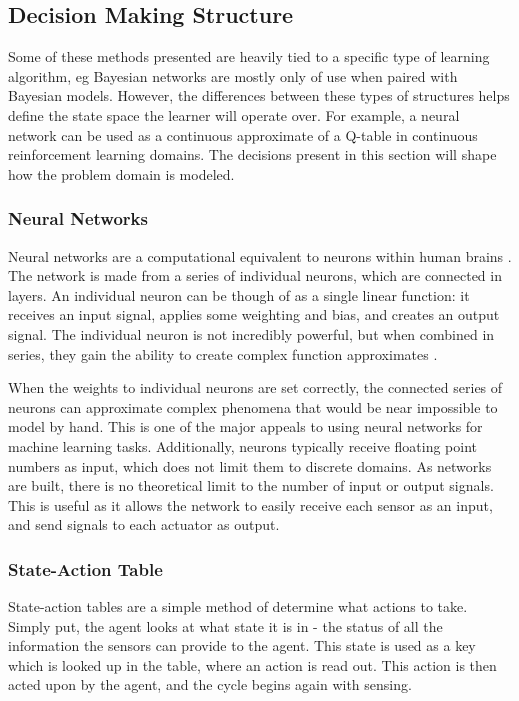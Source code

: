 \documentclass[draftclsnofoot,onecolumn,letterpaper,10pt]{IEEEtran}
\begin{document}
\subsection{Decision Making Structure}
Some of these methods presented are heavily tied to a specific type of learning algorithm, eg Bayesian networks are mostly only of use when paired with Bayesian models.
However, the differences between these types of structures helps define the state space the learner will operate over.
For example, a neural network can be used as a continuous approximate of a Q-table in continuous reinforcement learning domains.
The decisions present in this section will shape how the problem domain is modeled.

\subsubsection{Neural Networks}
Neural networks are a computational equivalent to neurons within human brains \cite{SuttonBarto}.
The network is made from a series of individual neurons, which are connected in layers.
An individual neuron can be though of as a single linear function: it receives an input signal, applies some weighting and bias, and creates an output signal.
The individual neuron is not incredibly powerful, but when combined in series, they gain the ability to create complex function approximates \cite{SuttonBarto}.

When the weights to individual neurons are set correctly, the connected series of neurons can approximate complex phenomena that would be near impossible to model by hand.
This is one of the major appeals to using neural networks for machine learning tasks.
Additionally, neurons typically receive floating point numbers as input, which does not limit them to discrete domains.
As networks are built, there is no theoretical limit to the number of input or output signals.
This is useful as it allows the network to easily receive each sensor as an input, and send signals to each actuator as output.

\subsubsection{State-Action Table}
State-action tables are a simple method of determine what actions to take.
Simply put, the agent looks at what state it is in - the status of all the information the sensors can provide to the agent.
This state is used as a key which is looked up in the table, where an action is read out.
This action is then acted upon by the agent, and the cycle begins again with sensing.
\end{document}
